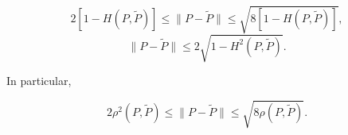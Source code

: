 $$2[1 - H(P, \tilde{P})] \leq \|P - \tilde{P}\| \leq \sqrt{8[1 - H(P, \tilde{P})]},$$
$$\|P - \tilde{P}\| \leq 2\sqrt{1 - H^2(P, \tilde{P})}.$$

In particular,

$$2\rho^2(P, \tilde{P}) \leq \|P - \tilde{P}\| \leq \sqrt{8\rho(P, \tilde{P})}.$$
